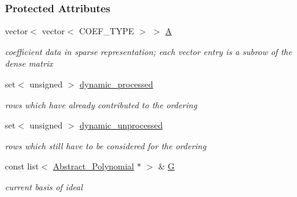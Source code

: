 \subsubsection*{Protected Attributes}
\begin{DoxyCompactItemize}
\item 
\mbox{\label{group___g_b_computation_ae99b64462e7d5f0aef6f196a4bc5c4cd}} 
vector$<$ vector$<$ C\+O\+E\+F\+\_\+\+T\+Y\+PE $>$ $>$ \hyperlink{group___g_b_computation_ae99b64462e7d5f0aef6f196a4bc5c4cd}{A}
\begin{DoxyCompactList}\small\item\em coefficient data in sparse representation; each vector entry is a subrow of the dense matrix \end{DoxyCompactList}\item 
\mbox{\label{group___g_b_computation_aa0e72696183319ea37b7b88e4772037e}} 
set$<$ unsigned $>$ \hyperlink{group___g_b_computation_aa0e72696183319ea37b7b88e4772037e}{dynamic\+\_\+processed}
\begin{DoxyCompactList}\small\item\em rows which have already contributed to the ordering \end{DoxyCompactList}\item 
\mbox{\label{group___g_b_computation_ae0c89b189358ae0d5f11599f6e40cdd4}} 
set$<$ unsigned $>$ \hyperlink{group___g_b_computation_ae0c89b189358ae0d5f11599f6e40cdd4}{dynamic\+\_\+unprocessed}
\begin{DoxyCompactList}\small\item\em rows which still have to be considered for the ordering \end{DoxyCompactList}\item 
\mbox{\label{group___g_b_computation_a3dbc8c690c4a21ba195ae32c19982f79}} 
const list$<$ \hyperlink{group__polygroup_class_abstract___polynomial}{Abstract\+\_\+\+Polynomial} $\ast$ $>$ \& \hyperlink{group___g_b_computation_a3dbc8c690c4a21ba195ae32c19982f79}{G}
\begin{DoxyCompactList}\small\item\em current basis of ideal \end{DoxyCompactList}\item 
\mbox{\label{group___g_b_computation_a1679f8bda319a602672bc866220bb7fb}} 

\end{DoxyCompactItemize}
